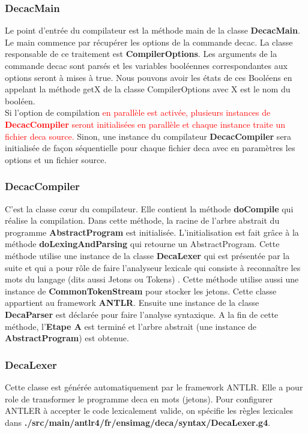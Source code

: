 \documentclass[12pt, a4paper, one side]{article}
\begin{document}
    \subsubsection{DecacMain}
    Le point d'entrée du compilateur est la méthode main de la classe \textbf {DecacMain}. Le main commence par récupérer les options de la commande decac. La classe responsable de ce traitement est \textbf{CompilerOptions}. Les arguments de la commande decac sont parsés et les variables booléennes correspondantes aux options seront à mises à true. Nous pouvons avoir les états de ces Booléens en appelant la méthode getX de la classe CompilerOptions avec X est le nom du booléen.
    \\
    Si l'option de compilation {\textcolor{red}{ en parallèle est activée, plusieurs instances de \textbf{DecacCompiler} seront initialisées en parallèle et chaque instance traite un fichier deca source.}}
    Sinon, une instance du compilateur \textbf{DecacCompiler} sera initialisée de façon séquentielle pour chaque fichier deca avec en paramètres les options et un fichier source.

    \subsubsection{DecacCompiler} C'est la classe cœur du compilateur. Elle contient la méthode \textbf{doCompile} qui réalise la compilation. Dans cette méthode, la racine de l'arbre abstrait du programme \textbf{AbstractProgram} est initialisée. L'initialisation est fait grâce à la méthode \textbf{doLexingAndParsing} qui retourne un AbstractProgram. Cette méthode utilise une instance de la classe \textbf{DecaLexer} qui est présentée par la suite et qui a pour rôle de faire l'analyseur lexicale qui consiste à reconnaître les mots du langage (dits aussi Jetons ou Tokens) . Cette méthode utilise aussi une instance de \textbf{CommonTokenStream} pour stocker les
    jetons. Cette classe appartient au framework \textbf{ANTLR}. Ensuite une instance de la classe \textbf{DecaParser} est déclarée pour faire l'analyse syntaxique. A la fin de cette méthode, l'\textbf{Etape A} est terminé et l'arbre abstrait (une instance de \textbf{AbstractProgram}) est obtenue.

    \subsubsection{DecaLexer} Cette classe est générée automatiquement par le framework ANTLR. Elle a pour role de transformer le programme deca en mots (jetons). Pour configurer ANTLER à accepter le code lexicalement valide, on spécifie les règles lexicales dans \textbf{./src/main/antlr4/fr/ensimag/deca/syntax/DecaLexer.g4}.
\end{document}
